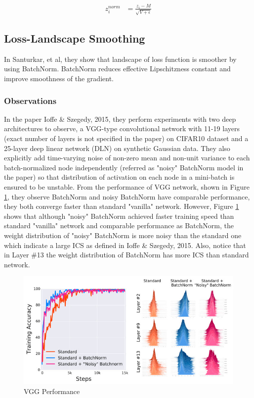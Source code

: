 \documentclass{article}
\begin{document}
\begin{align*}
    z_i^{norm}& = \frac{z_i-M}{\sqrt{V+\epsilon}}
\end{align*}


\subsection{Loss-Landscape Smoothing}
In Santurkar, et al, they show that landscape of loss function is smoother by using BatchNorm. BatchNorm reduces effective Lipschitzness constant and improve smoothness of the gradient.

\subsubsection{Observations}

In the paper Ioffe \& Szegedy, 2015, they perform experiments with two deep architectures to observe, a VGG-type convolutional network with 11-19 layers (exact number of layers is not specified in the paper) on CIFAR10 dataset and a 25-layer deep linear network (DLN) on synthetic Gaussian data. They also explicitly add time-varying noise of non-zero mean and non-unit variance to each batch-normalized node independently (referred as "noisy" BatchNorm model in the paper) so that distribution of activation on each node in a mini-batch is ensured to be unstable. From the performance of VGG network, shown in Figure \ref{fig:vgg}, they observe BatchNorm and noisy BatchNorm have comparable performance, they both converge faster than standard "vanilla" network. However, Figure \ref{fig:vgg} shows that although "noisy" BatchNorm achieved faster training speed than standard "vanilla" network and comparable performance as BatchNorm, the weight distribution of "noisy" BatchNorm  is more noisy than the standard one which indicate a large ICS as defined in Ioffe \& Szegedy, 2015. Also, notice that in Layer \#13 the weight distribution of BatchNorm has more ICS than standard network.

\begin{figure}[!ht]
	\centering
    \includegraphics[width=\textwidth]{pics/batchNorm/Santurkar_fig2.jpg}
	\caption{VGG Performance}
	\label{fig:vgg}
\end{figure}
\end{document}
